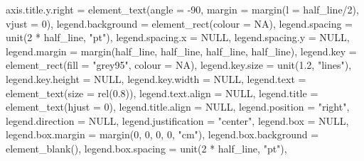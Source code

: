 \documentclass[
]{book}
\newenvironment{Shaded}{\begin{snugshade}}{\end{snugshade}}
\newcommand{\AttributeTok}[1]{\textcolor[rgb]{0.77,0.63,0.00}{#1}}
\newcommand{\ConstantTok}[1]{\textcolor[rgb]{0.00,0.00,0.00}{#1}}
\newcommand{\DecValTok}[1]{\textcolor[rgb]{0.00,0.00,0.81}{#1}}
\newcommand{\FloatTok}[1]{\textcolor[rgb]{0.00,0.00,0.81}{#1}}
\newcommand{\FunctionTok}[1]{\textcolor[rgb]{0.00,0.00,0.00}{#1}}
\newcommand{\NormalTok}[1]{#1}
\newcommand{\SpecialCharTok}[1]{\textcolor[rgb]{0.00,0.00,0.00}{#1}}
\newcommand{\StringTok}[1]{\textcolor[rgb]{0.31,0.60,0.02}{#1}}
\begin{document}
\begin{Shaded}
\begin{Highlighting}[]
               \AttributeTok{axis.title.y.right =} \FunctionTok{element\_text}\NormalTok{(}\AttributeTok{angle =} \SpecialCharTok{{-}}\DecValTok{90}\NormalTok{, }\AttributeTok{margin =} \FunctionTok{margin}\NormalTok{(}\AttributeTok{l =}\NormalTok{ half\_line}\SpecialCharTok{/}\DecValTok{2}\NormalTok{), }\AttributeTok{vjust =} \DecValTok{0}\NormalTok{), }
               \AttributeTok{legend.background =} \FunctionTok{element\_rect}\NormalTok{(}\AttributeTok{colour =} \ConstantTok{NA}\NormalTok{), }
               \AttributeTok{legend.spacing =} \FunctionTok{unit}\NormalTok{(}\DecValTok{2} \SpecialCharTok{*}\NormalTok{ half\_line, }\StringTok{"pt"}\NormalTok{), }
               \AttributeTok{legend.spacing.x =} \ConstantTok{NULL}\NormalTok{, }
               \AttributeTok{legend.spacing.y =} \ConstantTok{NULL}\NormalTok{, }
               \AttributeTok{legend.margin =} \FunctionTok{margin}\NormalTok{(half\_line, half\_line, half\_line, half\_line), }
               \AttributeTok{legend.key =} \FunctionTok{element\_rect}\NormalTok{(}\AttributeTok{fill =} \StringTok{"grey95"}\NormalTok{, }\AttributeTok{colour =} \ConstantTok{NA}\NormalTok{), }
               \AttributeTok{legend.key.size =} \FunctionTok{unit}\NormalTok{(}\FloatTok{1.2}\NormalTok{, }\StringTok{"lines"}\NormalTok{), }
               \AttributeTok{legend.key.height =} \ConstantTok{NULL}\NormalTok{, }
               \AttributeTok{legend.key.width =} \ConstantTok{NULL}\NormalTok{, }
               \AttributeTok{legend.text =} \FunctionTok{element\_text}\NormalTok{(}\AttributeTok{size =} \FunctionTok{rel}\NormalTok{(}\FloatTok{0.8}\NormalTok{)), }
               \AttributeTok{legend.text.align =} \ConstantTok{NULL}\NormalTok{, }
               \AttributeTok{legend.title =} \FunctionTok{element\_text}\NormalTok{(}\AttributeTok{hjust =} \DecValTok{0}\NormalTok{), }
               \AttributeTok{legend.title.align =} \ConstantTok{NULL}\NormalTok{, }
               \AttributeTok{legend.position =} \StringTok{"right"}\NormalTok{, }
               \AttributeTok{legend.direction =} \ConstantTok{NULL}\NormalTok{, }
               \AttributeTok{legend.justification =} \StringTok{"center"}\NormalTok{, }
               \AttributeTok{legend.box =} \ConstantTok{NULL}\NormalTok{, }
               \AttributeTok{legend.box.margin =} \FunctionTok{margin}\NormalTok{(}\DecValTok{0}\NormalTok{, }\DecValTok{0}\NormalTok{, }\DecValTok{0}\NormalTok{, }\DecValTok{0}\NormalTok{, }\StringTok{"cm"}\NormalTok{), }
               \AttributeTok{legend.box.background =} \FunctionTok{element\_blank}\NormalTok{(), }
               \AttributeTok{legend.box.spacing =} \FunctionTok{unit}\NormalTok{(}\DecValTok{2} \SpecialCharTok{*}\NormalTok{ half\_line, }\StringTok{"pt"}\NormalTok{), }

\end{Highlighting}
\end{Shaded}
\end{document}
